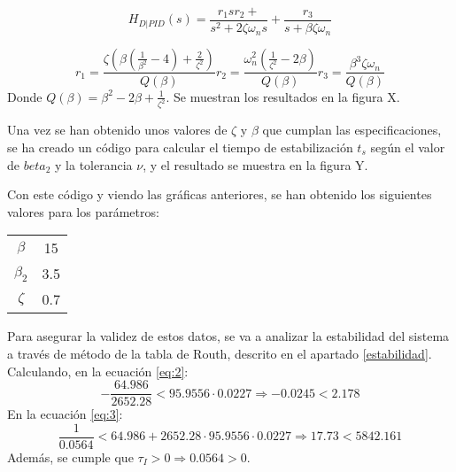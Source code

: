 \documentclass[a4paper]{article}
\begin{document}
\begin{equation}
	H_{D|PID}(s)=\frac{r_1 s r_2+}{s^2 + 2\zeta \omega_n s} + \frac{r_3}{s+ \beta \zeta \omega_n}
\end{equation}

\begin{subequations}
	\begin{equation}
		r_1 = \frac{\zeta(\beta(\frac{1}{\beta^2}-4)+\frac{2}{\zeta^2})}{Q(\beta)}
	\end{equation}
	\begin{equation}
		r_2 = \frac{\omega_n^2(\frac{1}{\zeta^2}-2\beta)}{Q(\beta)}
	\end{equation}
	\begin{equation}
		r_3=\frac{\beta^3 \zeta \omega_n}{Q(\beta)}
	\end{equation}
\end{subequations}
Donde $Q(\beta)=\beta^2-2 \beta + \frac{1}{\zeta^2}$.
Se muestran los resultados en la figura X.

Una vez se han obtenido unos valores de $\zeta$ y $\beta$ que cumplan las especificaciones, se ha creado un código para calcular el tiempo de estabilización $t_s$ según el valor de $beta_2$ y la tolerancia $\nu$, y el resultado se muestra en la figura Y.

Con este código y viendo las gráficas anteriores, se han obtenido los siguientes valores para los parámetros:

\begin{center}
	\begin{tabular}{c|c}
			$\beta$ & 15 \\ 
			$\beta_2$ & 3.5 \\ 
			$\zeta$ & 0.7 \\ 
	\end{tabular} 
\end{center}

Para asegurar la validez de estos datos, se va a analizar la estabilidad del sistema a través de método de la tabla de Routh, descrito en el apartado \ref{estabilidad}.
Calculando, en la ecuación \ref{eq:2}:	
\begin{equation}
	-\frac{64.986}{2652.28}< 95.9556\cdot0.0227 \Rightarrow 
	-0.0245<2.178
\end{equation}
En la ecuación \ref{eq:3}:
\begin{equation}
	\frac{1}{0.0564} < 64.986+2652.28\cdot95.9556\cdot0.0227 \Rightarrow
	17.73<5842.161
\end{equation}
Además, se cumple que $\tau_I > 0 \Rightarrow 0.0564>0$.
\end{document}
